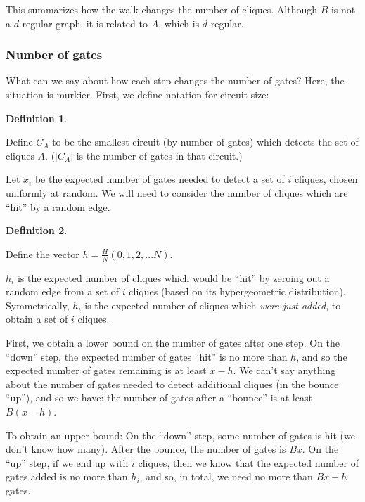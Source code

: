 \documentclass[12pt]{article}
\theoremstyle{definition}
\newtheorem{defn}{Definition}[section]
\begin{document}
This summarizes how the walk changes the number of cliques.
Although $B$ is not a $d$-regular graph, it is related to $A$, which is $d$-regular.

\subsubsection{Number of gates}

What can we say about how each step changes the number of gates? Here, the situation is murkier.
First, we define notation for circuit size:

\begin{defn} \label{defn:circuitSize}

Define $C_A$ to be the smallest circuit (by number of gates)
which detects the set of cliques $A$. ($|C_A|$ is the number of gates in that circuit.)

\end{defn}

Let $x_i$ be the expected number of gates needed to detect a set of $i$ cliques, chosen
uniformly at random. We will need to consider the number of cliques which are ``hit'' by
a random edge.

\begin{defn} \label{defn:sequenceVector}

Define the vector $h = \frac{H}{N}(0, 1, 2, ... N)$.

$h_i$ is the expected number of cliques which would be ``hit'' by zeroing out a random edge
from a set of $i$ cliques (based on its hypergeometric distribution).
Symmetrically, $h_i$ is the expected number of cliques which {\em were just added}, to obtain a
set of $i$ cliques.

\end{defn}

First, we obtain a lower bound on the number of gates after one step.
On the ``down'' step, the expected number of gates ``hit'' is no more than $h$,
and so the expected number of gates remaining is at least $x - h$.
We can't say anything about the number of gates needed to detect additional cliques (in the bounce ``up''), and so we have:
the number of gates after a ``bounce'' is at least $B(x-h)$.

To obtain an upper bound: On the ``down'' step, some number of gates is hit (we don't know how many).
After the bounce, the number of gates is $Bx$.
On the ``up'' step,
if we end up with $i$ cliques, then we know that the expected number of gates added is no more than $h_i$,
and so, in total, we need no more than $Bx+h$ gates.
\end{document}
